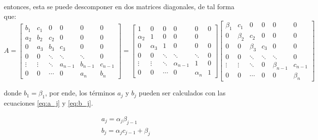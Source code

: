 entonces, esta se puede descomponer en dos matrices diagonales, de tal forma que:
\scriptsize
\begin{equation}
    A = \begin{bmatrix}
        b_1    & c_1    & 0      & 0       & 0       & 0       \\
        a_2    & b_2    & c_2    & 0       & 0       & 0       \\
        0      & a_3    & b_3    & c_3     & 0       & 0       \\
        0      & 0      & \ddots & \ddots  & \ddots  & 0       \\
        \vdots & \vdots & \ddots & a_{n-1} & b_{n-1} & c_{n-1} \\
        0      & 0      & \cdots & 0       & a_n     & b_n
    \end{bmatrix} =
    \begin{bmatrix}
        1        & 0        & 0      & 0            & 0        & 0 \\
        \alpha_2 & 1        & 0      & 0            & 0            \\
        0        & \alpha_3 & 1      & 0            & 0        & 0 \\
        0        & 0        & \ddots & \ddots       & \ddots   & 0 \\
        \vdots   & \vdots   & \ddots & \alpha_{n-1} & 1        & 0 \\
        0        & 0        & \cdots & 0            & \alpha_n & 1
    \end{bmatrix}\begin{bmatrix}
        \beta_1 & c_1     & 0       & 0      & 0           & 0       \\
        0       & \beta_2 & c_2     & 0      & 0           & 0       \\
        0       & 0       & \beta_3 & c_3    & 0           & 0       \\
        0       & 0       & \ddots  & \ddots & \ddots      & 0       \\
        \vdots  & \vdots  & \ddots  & 0      & \beta_{n-1} & c_{n-1} \\
        0       & 0       & \cdots  & 0      & 0           & \beta_n
    \end{bmatrix}
\end{equation}
\normalsize

donde $b_1 = \beta_1$, por ende, los términos $a_j$ y $b_j$ pueden ser calculados con las ecuaciones \ref{eq:a_j} y \ref{eq:b_j}.

\begin{align}
    a_j = \alpha_j \beta_{j-1}  \label{eq:a_j} \\
    b_j = \alpha_j c_{j-1} + \beta_j \label{eq:b_j}
\end{align}